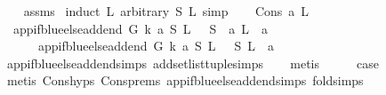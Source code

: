 \begin{isabellebody}
%
\isadelimproof
\ \ %
\endisadelimproof
%
\isatagproof
{}\isamarkupfalse%
\ assms\ \isanewline
{}\isamarkupfalse%
{\isacharparenleft}{\kern0pt}induct\ L{}\ arbitrary{\isacharcolon}{\kern0pt}\ S\ L{}{\isacharcomma}{\kern0pt}\ simp{\isacharparenright}{\kern0pt}\isanewline
\ \ \isamarkupfalse%
\ {\isacharparenleft}{\kern0pt}Cons\ a\ L{}{\isacharparenright}{\kern0pt}\isanewline
\ \ \isamarkupfalse%
\ \isamarkupfalse%
\ {\isachardoublequoteopen}\ {\isacharparenleft}{\kern0pt}app{\isacharunderscore}{\kern0pt}if{\isacharunderscore}{\kern0pt}blue{\isacharunderscore}{\kern0pt}else{\isacharunderscore}{\kern0pt}add{\isacharunderscore}{\kern0pt}end\ G\ k\ a\ {\isacharparenleft}{\kern0pt}S{\isacharcomma}{\kern0pt}\ L{}{\isacharparenright}{\kern0pt}{\isacharparenright}{\kern0pt}\ {\isacharequal}{\kern0pt}\ \ {\isacharparenleft}{\kern0pt}S\ {\isasymunion}\ {\isacharbraceleft}{\kern0pt}a{\isacharbraceright}{\kern0pt}{\isacharcomma}{\kern0pt}\ L{}\ {\isacharat}{\kern0pt}\ {\isacharbrackleft}{\kern0pt}a{\isacharbrackright}{\kern0pt}{\isacharparenright}{\kern0pt}{\isachardoublequoteclose}\isanewline
\ \ \ \ {\isacharbar}{\kern0pt}\ \ {\isachardoublequoteopen}{\isacharparenleft}{\kern0pt}app{\isacharunderscore}{\kern0pt}if{\isacharunderscore}{\kern0pt}blue{\isacharunderscore}{\kern0pt}else{\isacharunderscore}{\kern0pt}add{\isacharunderscore}{\kern0pt}end\ G\ k\ a\ {\isacharparenleft}{\kern0pt}S{\isacharcomma}{\kern0pt}\ L{}{\isacharparenright}{\kern0pt}{\isacharparenright}{\kern0pt}\ {\isacharequal}{\kern0pt}\ \ {\isacharparenleft}{\kern0pt}S{\isacharcomma}{\kern0pt}\ L{}\ {\isacharat}{\kern0pt}\ {\isacharbrackleft}{\kern0pt}a{\isacharbrackright}{\kern0pt}{\isacharparenright}{\kern0pt}{\isachardoublequoteclose}\isanewline
\ \ \isamarkupfalse%
\ app{\isacharunderscore}{\kern0pt}if{\isacharunderscore}{\kern0pt}blue{\isacharunderscore}{\kern0pt}else{\isacharunderscore}{\kern0pt}add{\isacharunderscore}{\kern0pt}end{\isachardot}{\kern0pt}simps\ add{\isacharunderscore}{\kern0pt}set{\isacharunderscore}{\kern0pt}list{\isacharunderscore}{\kern0pt}tuple{\isachardot}{\kern0pt}simps\isanewline
\ \ \isamarkupfalse%
\ metis\isanewline
\ \ \isamarkupfalse%
\ \isamarkupfalse%
\ {\isacharquery}{\kern0pt}case\isanewline
\ \ \ \ \isamarkupfalse%
\ {\isacharparenleft}{\kern0pt}metis\ Cons{\isachardot}{\kern0pt}hyps\ Cons{\isachardot}{\kern0pt}prems\ app{\isacharunderscore}{\kern0pt}if{\isacharunderscore}{\kern0pt}blue{\isacharunderscore}{\kern0pt}else{\isacharunderscore}{\kern0pt}add{\isacharunderscore}{\kern0pt}end{\isachardot}{\kern0pt}simps\ fold{\isacharunderscore}{\kern0pt}simps{\isacharparenleft}{\kern0pt}{}{\isacharparenright}{\kern0pt}{\isacharparenright}{\kern0pt}\ \isanewline

\end{isabellebody}
